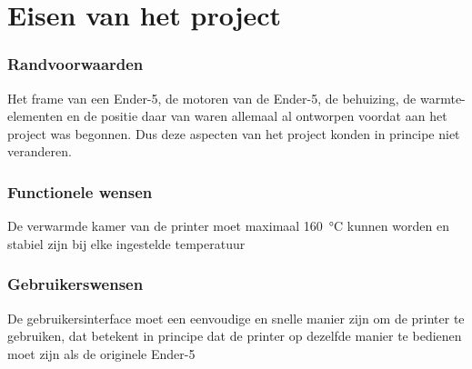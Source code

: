 \chapter{Eisen van het project}
\label{Eisen_van_het_project}

\subsection{Randvoorwaarden}

Het frame van een Ender-5, de motoren van de Ender-5, de behuizing, de
warmte-elementen en de positie daar van waren allemaal al ontworpen voordat aan
het project was begonnen. Dus deze aspecten van het project konden in principe niet
veranderen.

\subsection{Functionele wensen}

De verwarmde kamer van de printer moet maximaal \SI{160}{\celsius} kunnen
worden en stabiel zijn bij elke ingestelde temperatuur

\subsection{Gebruikerswensen}

De gebruikersinterface moet een eenvoudige en snelle manier zijn om de printer
te gebruiken, dat betekent in principe dat de printer op dezelfde manier te
bedienen moet zijn als de originele Ender-5

